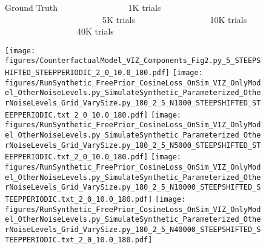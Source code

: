 \documentclass{article}
\begin{document}
\begin{figure}
\begin{comment}
python3 RunSynthetic_FreePrior_CosineLoss_OnSim_VIZ_OnlyModel_OtherNoiseLevels.py 2 0 10.0 180 SimulateSynthetic_Parameterized_OtherNoiseLevels_Grid_VarySize.py_180_2_3_N1000_STEEPPERIODIC_UNIFORM.txt
python3 RunSynthetic_FreePrior_CosineLoss_OnSim_VIZ_OnlyModel_OtherNoiseLevels.py 2 0 10.0 180 SimulateSynthetic_Parameterized_OtherNoiseLevels_Grid_VarySize.py_180_2_3_N5000_STEEPPERIODIC_UNIFORM.txt
python3 RunSynthetic_FreePrior_CosineLoss_OnSim_VIZ_OnlyModel_OtherNoiseLevels.py 2 0 10.0 180 SimulateSynthetic_Parameterized_OtherNoiseLevels_Grid_VarySize.py_180_2_3_N10000_STEEPPERIODIC_UNIFORM.txt
python3 RunSynthetic_FreePrior_CosineLoss_OnSim_VIZ_OnlyModel_OtherNoiseLevels.py 2 0 10.0 180 SimulateSynthetic_Parameterized_OtherNoiseLevels_Grid_VarySize.py_180_2_3_N40000_STEEPPERIODIC_UNIFORM.txt


python3 RunSynthetic_FreePrior_CosineLoss_OnSim_VIZ_OnlyModel_OtherNoiseLevels.py 2 0 10.0 180 SimulateSynthetic_Parameterized_OtherNoiseLevels_Grid_VarySize.py_180_2_2_N1000_STEEPPERIODIC_UNIFORM.txt
python3 RunSynthetic_FreePrior_CosineLoss_OnSim_VIZ_OnlyModel_OtherNoiseLevels.py 2 0 10.0 180 SimulateSynthetic_Parameterized_OtherNoiseLevels_Grid_VarySize.py_180_2_2_N5000_STEEPPERIODIC_UNIFORM.txt
python3 RunSynthetic_FreePrior_CosineLoss_OnSim_VIZ_OnlyModel_OtherNoiseLevels.py 2 0 10.0 180 SimulateSynthetic_Parameterized_OtherNoiseLevels_Grid_VarySize.py_180_2_2_N10000_STEEPPERIODIC_UNIFORM.txt
python3 RunSynthetic_FreePrior_CosineLoss_OnSim_VIZ_OnlyModel_OtherNoiseLevels.py 2 0 10.0 180 SimulateSynthetic_Parameterized_OtherNoiseLevels_Grid_VarySize.py_180_2_2_N40000_STEEPPERIODIC_UNIFORM.txt



\end{comment}
\centering

Ground Truth
  \ \  \ \ \ \  \ \  \ \ \ \ \ \ \ \ 
 1K trials
  \ \  \ \  \ \  \ \ \ \ \ \ \ \ \ \ \ \ \ \ \ \ \  
 5K trials
  \ \  \ \  \ \  \ \ \ \ \ \ \ \ \ \ \ 
 10K trials 
 \ \  \ \  \ \  \ \ \ \ \ \ \ \ \ \ \ 
40K trials
\ \ \ \ \ 


\texttt{[image: figures/CounterfactualModel\_VIZ\_Components\_Fig2.py\_5\_STEEPSHIFTED\_STEEPPERIODIC\_2\_0\_10.0\_180.pdf]}
\texttt{[image: figures/RunSynthetic\_FreePrior\_CosineLoss\_OnSim\_VIZ\_OnlyModel\_OtherNoiseLevels.py\_SimulateSynthetic\_Parameterized\_OtherNoiseLevels\_Grid\_VarySize.py\_180\_2\_5\_N1000\_STEEPSHIFTED\_STEEPPERIODIC.txt\_2\_0\_10.0\_180.pdf]}
\texttt{[image: figures/RunSynthetic\_FreePrior\_CosineLoss\_OnSim\_VIZ\_OnlyModel\_OtherNoiseLevels.py\_SimulateSynthetic\_Parameterized\_OtherNoiseLevels\_Grid\_VarySize.py\_180\_2\_5\_N5000\_STEEPSHIFTED\_STEEPPERIODIC.txt\_2\_0\_10.0\_180.pdf]}
\texttt{[image: figures/RunSynthetic\_FreePrior\_CosineLoss\_OnSim\_VIZ\_OnlyModel\_OtherNoiseLevels.py\_SimulateSynthetic\_Parameterized\_OtherNoiseLevels\_Grid\_VarySize.py\_180\_2\_5\_N10000\_STEEPSHIFTED\_STEEPPERIODIC.txt\_2\_0\_10.0\_180.pdf]}
\texttt{[image: figures/RunSynthetic\_FreePrior\_CosineLoss\_OnSim\_VIZ\_OnlyModel\_OtherNoiseLevels.py\_SimulateSynthetic\_Parameterized\_OtherNoiseLevels\_Grid\_VarySize.py\_180\_2\_5\_N40000\_STEEPSHIFTED\_STEEPPERIODIC.txt\_2\_0\_10.0\_180.pdf]}



\end{figure}
\end{document}
